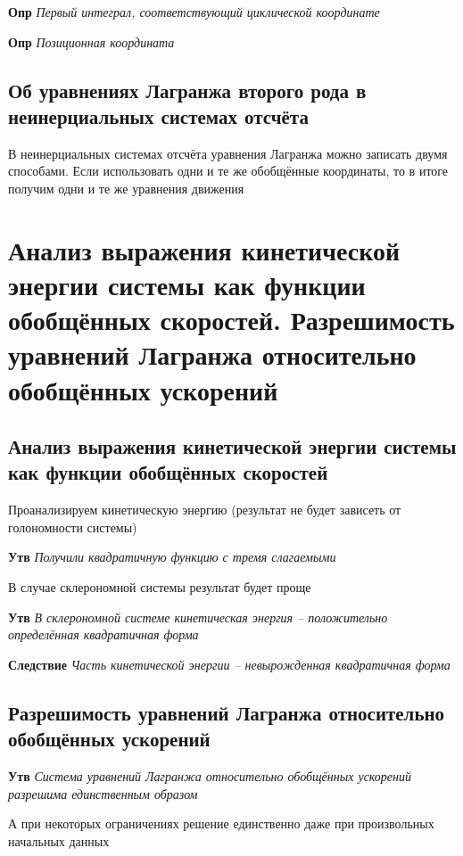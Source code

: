 \documentclass[a4paper, 14pt]{article}
\begin{document}
    \textbf{Опр} \textit{Первый интеграл, соответствующий циклической координате}
    
    \textbf{Опр} \textit{Позиционная координата}
    
    \subsection{Об уравнениях Лагранжа второго рода в неинерциальных системах отсчёта}
    
    В неинерциальных системах отсчёта уравнения Лагранжа можно записать двумя способами.
    Если использовать одни и те же обобщённые координаты, то в итоге получим одни и те же уравнения движения
    
    \section{Анализ выражения кинетической энергии системы как функции обобщённых скоростей.
    Разрешимость уравнений Лагранжа относительно обобщённых ускорений}
    
    \subsection{Анализ выражения кинетической энергии системы как функции обобщённых скоростей}
    
    Проанализируем кинетическую энергию (результат не будет зависеть от голономности системы)
    
    \textbf{Утв} \textit{Получили квадратичную функцию с тремя слагаемыми}
    
    В случае склерономной системы результат будет проще
    
    \textbf{Утв} \textit{В склерономной системе кинетическая энергия -- положительно определённая квадратичная форма}
    
    \textbf{Следствие} \textit{Часть кинетической энергии -- невырожденная квадратичная форма}
    
    \subsection{Разрешимость уравнений Лагранжа относительно обобщённых ускорений}
    
    \textbf{Утв} \textit{Система уравнений Лагранжа относительно обобщённых ускорений разрешима единственным образом}
    
    А при некоторых ограничениях решение единственно даже при произвольных начальных данных
    
\end{document}
